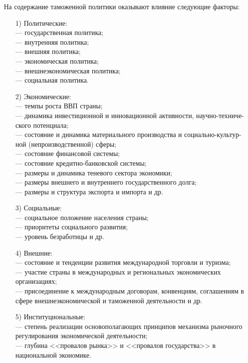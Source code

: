 На содержание таможенной политики оказывают влияние следующие факторы:
\begin{enumerate}
	\item [1)] Политические:\\
	--- государственная политика;\\
	--- внутренняя политика;\\
	--- внешняя политика;\\
	--- экономическая политика;\\
	--- внешнеэкономическая политика;\\
	--- социальная политика.
	\item [2)] Экономические:\\
	--- темпы роста ВВП страны;\\
	--- динамика инвестиционной и инновационной активности, научно-техниче-ского потенциала;\\
	--- состояние и динамика материального производства и социально-культур-ной (непроизводственной) сферы;\\
	--- состояние финансовой системы;\\
	--- состояние кредитно-банковской системы;\\
	--- размеры и динамика теневого сектора экономики;\\
	--- размеры внешнего и внутреннего государственного долга;\\
	--- размеры и структура экспорта и импорта и др.
	\item [3)] Социальные:\\
	--- социальное положение населения страны;\\
	--- приоритеты социального развития;\\
	--- уровень безработицы и др.
	\item [4)] Внешние:\\
	--- состояние и тенденции развития международной торговли и туризма;\\
	--- участие страны в международных и региональных экономических организациях;\\
	--- присоединение к международным договорам, конвенциям, соглашениям в сфере внешнеэкономической и таможенной деятельности и др.
	\item [5)] Институциональные:\\
	--- степень реализации основополагающих принципов механизма рыночного регулирования экономической деятельности;\\
	--- глубина <<провалов рынка>> и <<провалов государства>> в национальной экономике.
\end{enumerate}

